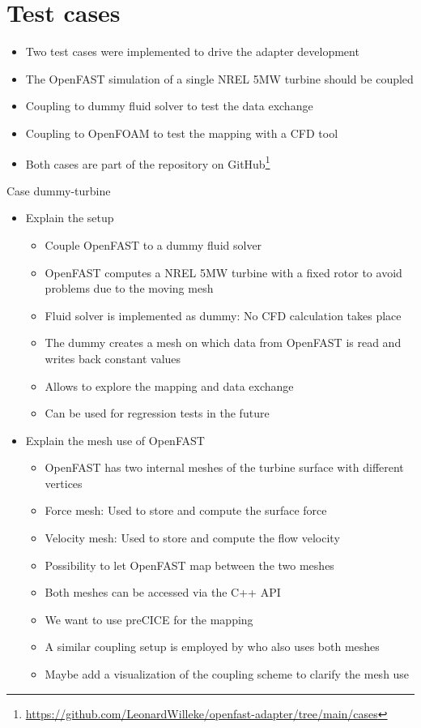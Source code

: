 \section{Test cases}

\begin{itemize}
	\item Two test cases were implemented to drive the adapter development
	\item The OpenFAST simulation of a single NREL 5MW turbine \cite{Jonkman:2009} should be coupled
	\item Coupling to dummy fluid solver to test the data exchange
	\item Coupling to OpenFOAM to test the mapping with a CFD tool
	\item Both cases are part of the repository on GitHub\footnote{\url{https://github.com/LeonardWilleke/openfast-adapter/tree/main/cases}}\\
\end{itemize}

Case dummy-turbine
\begin{itemize}
	\item Explain the setup
	\begin{itemize}
		\item Couple OpenFAST to a dummy fluid solver
		\item OpenFAST computes a NREL 5MW turbine with a fixed rotor to avoid problems due to the moving mesh
		\item Fluid solver is implemented as dummy: No CFD calculation takes place
		\item The dummy creates a mesh on which data from OpenFAST is read and writes back constant values
		\item Allows to explore the mapping and data exchange
		\item Can be used for regression tests in the future
	\end{itemize}
	\item Explain the mesh use of OpenFAST
	\begin{itemize}
		\item OpenFAST has two internal meshes of the turbine surface with different vertices
		\item Force mesh: Used to store and compute the surface force
		\item Velocity mesh: Used to store and compute the flow velocity
		\item Possibility to let OpenFAST map between the two meshes
		\item Both meshes can be accessed via the C++ API
		\item We want to use preCICE for the mapping
		\item A similar coupling setup is employed by \cite{Taschner:2022} who also uses both meshes
		\item Maybe add a visualization of the coupling scheme to clarify the mesh use\\
	\end{itemize}
\end{itemize}

